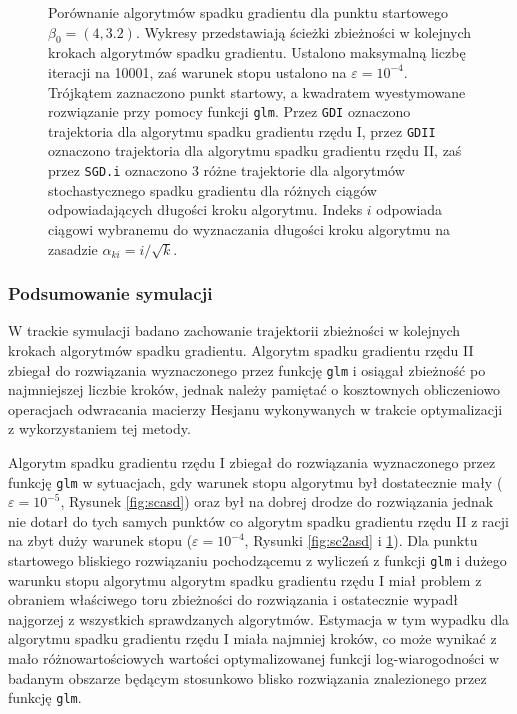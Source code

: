 \begin{figure}[hbt!]
  \caption[Porównanie algorytmów spadku gradientu dla punktu startowego $\beta_0 = (4,3.2)$.]{\label{fig:sc4asd}Porównanie algorytmów spadku gradientu dla punktu startowego $\beta_0 = (4,3.2)$. Wykresy przedstawiają ścieżki zbieżności w kolejnych krokach algorytmów spadku gradientu. Ustalono maksymalną liczbę iteracji na 10001, zaś warunek stopu ustalono na $\varepsilon=10^{-4}$. Trójkątem zaznaczono punkt startowy, a kwadratem wyestymowane rozwiązanie przy pomocy funkcji \texttt{glm}. Przez \texttt{GDI} oznaczono trajektoria dla algorytmu spadku gradientu rzędu I, przez \texttt{GDII} oznaczono trajektoria dla algorytmu spadku gradientu rzędu II, zaś przez \texttt{SGD.i} oznaczono 3 różne trajektorie dla algorytmów stochastycznego spadku gradientu dla różnych ciągów odpowiadających długości kroku algorytmu. Indeks $i$ odpowiada ciągowi wybranemu do wyznaczania długości kroku algorytmu na zasadzie $\alpha_{ki} = i/\sqrt{k}$.}
\end{figure}


\newpage

\subsubsection{Podsumowanie symulacji}
W trackie symulacji badano zachowanie trajektorii zbieżności w kolejnych krokach algorytmów spadku gradientu. Algorytm spadku gradientu rzędu II zbiegał do rozwiązania wyznaczonego przez funkcję \texttt{glm} i osiągał zbieżność po najmniejszej liczbie kroków, jednak należy pamiętać o kosztownych obliczeniowo operacjach odwracania macierzy Hesjanu wykonywanych w trakcie optymalizacji z wykorzystaniem tej metody. 

Algorytm spadku gradientu rzędu I zbiegał do rozwiązania wyznaczonego przez funkcję \texttt{glm} w sytuacjach, gdy warunek stopu algorytmu był dostatecznie mały ($\varepsilon = 10^{-5}$, Rysunek \ref{fig:scasd}) oraz był na dobrej drodze do rozwiązania jednak nie dotarł do tych samych punktów co algorytm spadku gradientu rzędu II z racji na zbyt duży warunek stopu ($\varepsilon = 10^{-4}$, Rysunki \ref{fig:sc2asd} i \ref{fig:sc4asd}). Dla punktu startowego bliskiego rozwiązaniu pochodzącemu z wyliczeń z funkcji \texttt{glm} i dużego warunku stopu algorytmu algorytm spadku gradientu rzędu I miał problem z obraniem właściwego toru zbieżności do rozwiązania i ostatecznie wypadł najgorzej z wszystkich sprawdzanych algorytmów. Estymacja w tym wypadku dla algorytmu spadku gradientu rzędu I miała najmniej kroków, co może wynikać z mało różnowartościowych wartości optymalizowanej funkcji log-wiarogodności w badanym obszarze będącym stosunkowo blisko rozwiązania znalezionego przez funkcję \texttt{glm}.

